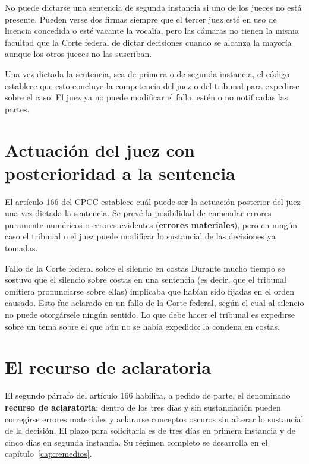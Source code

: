 \documentclass[12pt,oneside]{book}
\begin{document}
\begin{important}
No puede dictarse una sentencia de segunda instancia si uno de los jueces no está presente. Pueden verse dos firmas siempre que el tercer juez esté en uso de licencia concedida o esté vacante la vocalía, pero las cámaras no tienen la misma facultad que la Corte federal de dictar decisiones cuando se alcanza la mayoría aunque los otros jueces no las suscriban.
\end{important}

Una vez dictada la sentencia, sea de primera o de segunda instancia, el código establece que esto concluye la competencia del juez o del tribunal para expedirse sobre el caso. El juez ya no puede modificar el fallo, estén o no notificadas las partes.

\section{Actuación del juez con posterioridad a la sentencia}

El artículo 166 del CPCC establece cuál puede ser la actuación posterior del juez una vez dictada la sentencia. Se prevé la posibilidad de enmendar errores puramente numéricos o errores evidentes (\textbf{errores materiales}), pero en ningún caso el tribunal o el juez puede modificar lo sustancial de las decisiones ya tomadas.

\begin{example}{Fallo de la Corte federal sobre el silencio en costas}
Durante mucho tiempo se sostuvo que el silencio sobre costas en una sentencia (es decir, que el tribunal omitiera pronunciarse sobre ellas) implicaba que habían sido fijadas en el orden causado. Esto fue aclarado en un fallo de la Corte federal, según el cual al silencio no puede otorgársele ningún sentido. Lo que debe hacer el tribunal es expedirse sobre un tema sobre el que aún no se había expedido: la condena en costas.
\end{example}

\section{El recurso de aclaratoria}

El segundo párrafo del artículo 166 habilita, a pedido de parte, el denominado \textbf{recurso de aclaratoria}: dentro de los tres días y sin sustanciación pueden corregirse errores materiales y aclararse conceptos oscuros sin alterar lo sustancial de la decisión. El plazo para solicitarla es de tres días en primera instancia y de cinco días en segunda instancia. Su régimen completo se desarrolla en el capítulo~\ref{cap:remedios}.
\end{document}
